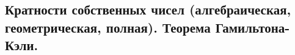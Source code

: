 \subsection{Кратности собственных чисел (алгебраическая, геометрическая, полная). Теорема Гамильтона-Кэли. }


